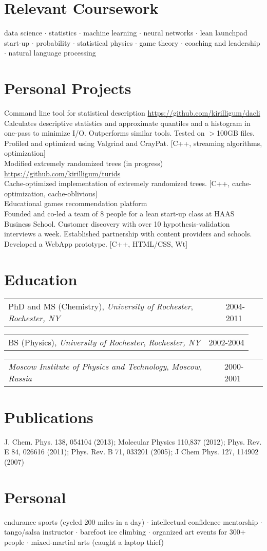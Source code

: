 \documentclass{res}
\makeatletter
\newcommand{\af}[3]{
\begin{tabular*}{\textwidth}[t]{@{}p{4.2in} l} 
    #1, \textit{#2} & #3\\
  \end{tabular*}
}
\newcommand{\skills}[2]{
  #1\\
  {\color[RGB]{106,106,106} #2}\\
}
\makeatother
\begin{document}
\begin{resume}
\section{Relevant Coursework}
  data science $\cdot$
  statistics $\cdot$
  machine learning $\cdot$
  neural networks $\cdot$
  lean launchpad start-up $\cdot$
  probability $\cdot$
  statistical physics $\cdot$
  game theory $\cdot$
  coaching and leadership $\cdot$
  natural language processing
\\
\section{Personal Projects}
\skills{Command line tool for statistical description \url{https://github.com/kirilligum/dacli}}{
  Calculates descriptive statistics and approximate quantiles and a histogram in one-pass to minimize I/O. 
  Outperforms similar tools. Tested on $>$100GB files. Profiled and optimized using Valgrind and CrayPat.
  [C++, streaming algorithms, optimization]
}
\skills{Modified extremely randomized trees (in progress) \url{https://github.com/kirilligum/turids}}{
  Cache-optimized implementation of extremely randomized trees. 
  [C++, cache-optimization, cache-oblivious]
}
\skills{Educational games recommendation platform}{
  Founded and co-led a team of 8 people for a lean start-up class at HAAS Business School. 
  Customer discovery with over 10 hypothesis-validation interviews a week. 
  Established partnership with content providers and schools.
  Developed a WebApp prototype. [C++, HTML/CSS, Wt]
}

\section{Education}          
\af{PhD and MS (Chemistry), \textit{University of Rochester}}{Rochester, NY}{2004-2011}
\af{BS (Physics), \textit{University of Rochester}}{Rochester, NY}{2002-2004}
\af{\textit{Moscow Institute of Physics and Technology}}{Moscow, Russia} {2000-2001}
\section{Publications}
  J. Chem. Phys.  138, 054104 (2013);
  Molecular Physics 110,837 (2012);
  Phys. Rev. E 84, 026616 (2011);
  Phys. Rev. B 71, 033201 (2005);
  J Chem Phys. 127, 114902 (2007)
\\

\section{Personal}          
endurance sports (cycled 200 miles in a day) $\cdot$
intellectual confidence mentorship $\cdot$
tango/salsa instructor $\cdot$
barefoot ice climbing $\cdot$
organized art events for 300+ people $\cdot$
mixed-martial arts (caught a laptop thief)
 
\end{resume}
\end{document}
